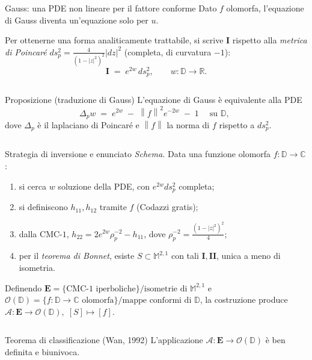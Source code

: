 \documentclass[aspectratio=169,11pt]{beamer}
\newcommand{\C}{\mathbb{C}}
\newcommand{\R}{\mathbb{R}}
\newcommand{\D}{\mathbb{D}}
\newcommand{\M}{\mathbb{M}^{2,1}}
\newcommand{\OD}{\mathcal{O}(\D)}
\newcommand{\EE}{\mathbf{E}}
\newcommand{\Amap}{\mathcal{A}}
\newcommand{\Iff}{\mathbf{I}}
\newcommand{\IIff}{\mathbf{II}}
\newcommand{\norm}[1]{\left\lVert #1 \right\rVert}
\begin{document}
\begin{frame}[t]{Gauss: una PDE non lineare per il fattore conforme}
  Dato $f$ olomorfa, l'equazione di Gauss diventa un'equazione
  \alert{solo per $u$}.

  \vspace{1mm}
  Per ottenerne una forma analiticamente trattabile, si scrive $\Iff$
  rispetto alla \emph{metrica di Poincaré}
  $ds_p^2 = \frac{4}{(1-|z|^2)^2}|dz|^2$ (completa, di curvatura $-1$):
  \[
    \Iff \;=\; e^{2w}\,ds_p^2,
    \qquad
    w:\D\to\R.
  \]

  \vspace{1mm}
  \begin{columns}[T,onlytextwidth]
    \hfill
    \begin{block}{Proposizione (traduzione di Gauss)}
      \centering
      L'equazione di Gauss è equivalente alla PDE
      \[
        \boxed{\;\Delta_p w \;=\; e^{2w}\;-\;\norm{f}^2 e^{-2w}\;-\;1\;}
        \quad\text{su }\D,
      \]
      dove $\Delta_p$ è il laplaciano di Poincaré e $\norm{f}$ la
      norma di $f$ rispetto a $ds_p^2$.
    \end{block}
    \hfill
  \end{columns}
\end{frame}


\begin{frame}[t]{Strategia di inversione e enunciato}
  \emph{Schema.} Data una funzione olomorfa $f:\D\to\C$:
  \begin{enumerate}\itemsep=0pt
    \item si cerca $w$ soluzione della PDE, con $e^{2w}ds_p^2$ completa;
    \item si definiscono $h_{11},h_{12}$ tramite $f$ (Codazzi gratis);
    \item dalla CMC-$1$, $h_{22}=2e^{2w}\rho_p^{-2}-h_{11}$, dove
          $\rho_p^{-2}=\frac{(1-|z|^2)^2}{4}$;
    \item per il \emph{teorema di Bonnet}, esiste $S\subset\M$ con
          tali $\Iff,\IIff$, unica a meno di isometria.
  \end{enumerate}

  \vspace{2mm}
  Definendo
  $\EE = \{\text{CMC-$1$ iperboliche}\}/\text{isometrie di }\M$ e
  $\OD = \{f:\D\to\C \text{ olomorfa}\}/\text{mappe conformi di }\D$,
  la costruzione produce
  $\Amap:\EE\to\OD,\;[S]\mapsto[f]$.

  \vspace{2mm}
  \begin{columns}[T,onlytextwidth]
    \hfill
    \begin{block}{Teorema di classificazione (Wan, 1992)}
      \centering
      L'applicazione $\Amap:\EE\to\OD$ è
      \alert{ben definita e biunivoca}.
    \end{block}
    \hfill
  \end{columns}
\end{frame}
\end{document}

